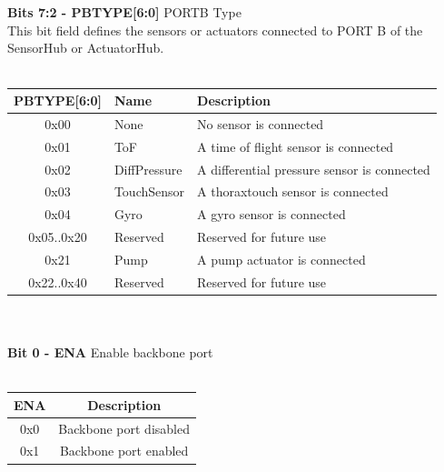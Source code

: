 \\\\
\textbf{Bits 7:2 - PBTYPE[6:0]} PORTB Type\\
This bit field defines the sensors or actuators connected to PORT B of the SensorHub or
ActuatorHub.\\\\
\begin{tabular}{|c|l|l|}
    \hline
    PBTYPE[6:0] & Name & Description \\ \hline
    0x00 & None & No sensor is connected\\ \hline
    0x01 & ToF & A time of flight sensor is connected\\ \hline
    0x02 & DiffPressure & A differential pressure sensor is connected\\ \hline
    0x03 & TouchSensor & A thoraxtouch sensor is connected\\ \hline
    0x04 & Gyro & A gyro sensor is connected\\ \hline
    0x05..0x20 & Reserved & Reserved for future use\\ \hline
    0x21 & Pump & A pump actuator is connected\\ \hline
    0x22..0x40 & Reserved & Reserved for future use \\ \hline
\end{tabular}
\\\\
\textbf{Bit 0 - ENA} Enable backbone port\\\\
\begin{tabular}{|c|c|}
    \hline
   ENA & Description\\ \hline
   0x0 & Backbone port disabled\\ \hline
   0x1 & Backbone port enabled \\ \hline
\end{tabular}

\pagebreak

